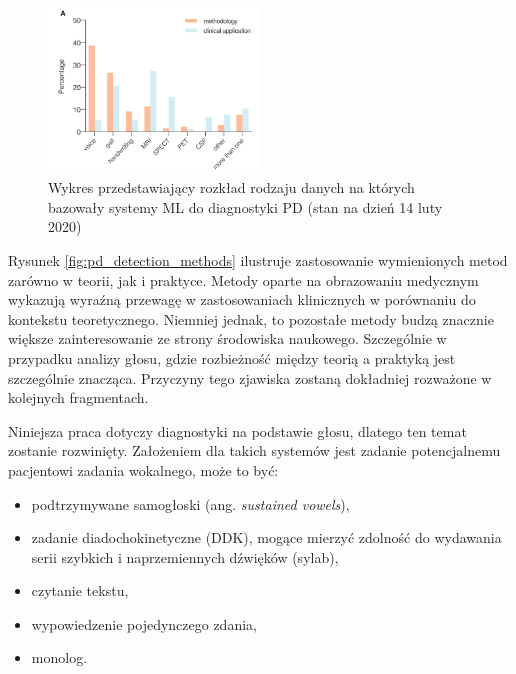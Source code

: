 \begin{figure}[htbp]
	\centering
	\includegraphics[width=0.5\textwidth]{./img/plot_PD_detection_methods}
	\caption{Wykres przedstawiający rozkład rodzaju danych na których bazowały systemy ML do diagnostyki PD (stan na dzień 14 luty 2020) \cite{ML_for_PD_review} }
    \label{fig:pd_detection_methods}\label{fig:figure}
\end{figure}

Rysunek \ref{fig:pd_detection_methods} ilustruje zastosowanie wymienionych metod zarówno w teorii, jak i praktyce.
Metody oparte na obrazowaniu medycznym wykazują wyraźną przewagę w zastosowaniach klinicznych w porównaniu do kontekstu teoretycznego.
Niemniej jednak, to pozostałe metody budzą znacznie większe zainteresowanie ze strony środowiska naukowego.
Szczególnie w przypadku analizy głosu, gdzie rozbieżność między teorią a praktyką jest szczególnie znacząca.
Przyczyny tego zjawiska zostaną dokładniej rozważone w kolejnych fragmentach.

Niniejsza praca dotyczy diagnostyki na podstawie głosu, dlatego ten temat zostanie rozwinięty.
Założeniem dla takich systemów jest zadanie potencjalnemu pacjentowi zadania wokalnego, może to być:
\begin{itemize}[itemsep=0.1pt]
	\item podtrzymywane samogłoski (ang. \emph{sustained vowels}),
	\item zadanie diadochokinetyczne (DDK), mogące mierzyć zdolność do wydawania serii szybkich i naprzemiennych dźwięków (sylab),
	\item czytanie tekstu,
	\item wypowiedzenie pojedynczego zdania,
	\item monolog.
\end{itemize}

